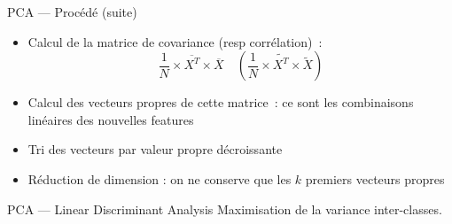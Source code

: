 \begin{frame}{PCA --- Procédé (suite)}
  \begin{itemize}[<+->]
    \item Calcul de la matrice de covariance (resp corrélation)~:
      \[
      \frac{1}{N} \times \overline{X^T} \times \overline{X}
      \quad
      ( \frac{1}{N} \times \widetilde{X^T} \times \widetilde{X} )
      \]
    \item Calcul des vecteurs propres de cette matrice~: ce sont les combinaisons linéaires des nouvelles features
    \item Tri des vecteurs par valeur propre décroissante
    \item Réduction de dimension : on ne conserve que les $k$ premiers vecteurs propres
  \end{itemize}
\end{frame}

\begin{frame}{PCA --- Linear Discriminant Analysis}
  Maximisation de la variance inter-classes.

  \begin{minipage}[l]{0.49\linewidth}
  \end{minipage}\hfill
  \begin{minipage}[l]{0.49\linewidth}
  \end{minipage}\hfill
\end{frame}
